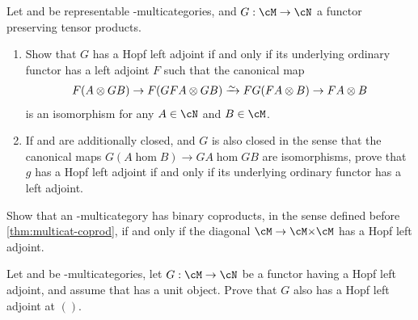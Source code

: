 \begin{ex}\label{ex:hopf-ladj}
  Let \cM and \cN be representable \fS-multicategories, and $G:\cM\to\cN$ a functor preserving tensor products.
  \begin{enumerate}
  \item Show that $G$ has a Hopf left adjoint if and only if its underlying ordinary functor has a left adjoint $F$ such that the canonical map
    \begin{gather*}
      F(A\tensor G B) \to F(G F A \tensor G B) \toiso F G(F A \tensor B) \to F A \tensor B
    \end{gather*}
    is an isomorphism for any $A\in\cN$ and $B\in \cM$.
  \item If \cM and \cN are additionally closed, and $G$ is also closed in the sense that the canonical maps $G(A\hom B) \to G A \hom G B$ are isomorphisms, prove that $g$ has a Hopf left adjoint if and only if its underlying ordinary functor has a left adjoint.
  \end{enumerate}
\end{ex}

\begin{ex}\label{ex:multicat-coprod-ladj}
  Show that an \fS-multicategory \cM has binary coproducts, in the sense defined before \cref{thm:multicat-coprod}, if and only if the diagonal $\cM\to \cM\times \cM$ has a Hopf left adjoint.
\end{ex}

\begin{ex}\label{ex:hopf-ladj-at-one}
  Let \cM and \cN be \fS-multicategories, let $G:\cM\to\cN$ be a functor having a Hopf left adjoint, and assume that \cN has a unit object.
  Prove that $G$ also has a Hopf left adjoint at $()$.
\end{ex}

